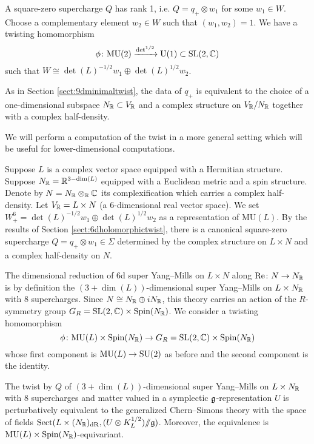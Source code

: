 \documentclass[10pt, oneside]{article}
\newcommand{\MU}{\mathrm{MU}}
\renewcommand{\Re}{\mathrm{Re}}
\newcommand{\Sect}{\mathrm{Sect}}
\renewcommand{\U}{\mathrm{U}}
\newcommand{\ham}{/\!\!/}
\begin{document}
A square-zero supercharge $Q$ has rank 1, i.e. $Q=q_+\otimes w_1$ for some $w_1\in W$. Choose a complementary element $w_2\in W$ such that $(w_1, w_2) = 1$. We have a twisting homomorphism
\[\phi\colon\MU(2)\xrightarrow{\det^{1/2}}\U(1)\subset \SL(2, \CC)\]
such that $W\cong \det(L)^{-1/2} w_1\oplus \det(L)^{1/2} w_2$.

As in Section \ref{sect:9dminimaltwist}, the data of $q_+$ is equivalent to the choice of a one-dimensional subspace $N_\mathbb R\subset V_\mathbb R$ and a complex structure on $V_\mathbb R/N_\mathbb R$ together with a complex half-density.

We will perform a computation of the twist in a more general setting which will be useful for lower-dimensional computations.

Suppose $L$ is a complex vector space equipped with a Hermitian structure. Suppose $N_\mathbb R=\mathbb R^{3-\dim(L)}$ equipped with a Euclidean metric and a spin structure. Denote by $N=N_\mathbb R\otimes_\mathbb R\mathbb C$ its complexification which carries a complex half-density. Let $V_\mathbb R=L\times N$ (a 6-dimensional real vector space). We set $W^6_+=\det(L)^{-1/2}w_1\oplus \det(L)^{1/2} w_2$ as a representation of $\MU(L)$. By the results of Section \ref{sect:6dholomorphictwist}, there is a canonical square-zero supercharge $Q=q_+\otimes w_1\in\Sigma$ determined by the complex structure on $L\times N$ and a complex half-density on $N$.

The dimensional reduction of 6d super Yang--Mills on $L\times N$ along $\Re\colon N\rightarrow N_\RR$ is by definition the $(3+\dim(L))$-dimensional super Yang--Mills on $L\times N_\mathbb R$ with 8 supercharges. Since $N\cong N_\mathbb R\oplus iN_\mathbb R$, this theory carries an action of the $R$-symmetry group $G_R=\mathrm{SL}(2, \mathbb C)\times \mathrm{Spin}(N_\mathbb R)$. We consider a twisting homomorphism
\[\phi\colon \MU(L)\times \Spin(N_\RR)\rightarrow G_R=\SL(2, \CC)\times \Spin(N_\RR)\]
whose first component is $\MU(L)\rightarrow \SU(2)$ as before and the second component is the identity.

\begin{theorem}
The twist by $Q$ of $(3+\dim(L))$-dimensional super Yang--Mills on $L\times N_\mathbb R$ with 8 supercharges and matter valued in a symplectic $\mathfrak g$-representation $U$ is perturbatively equivalent to the generalized Chern--Simons theory with the space of fields $\Sect(L\times (N_\RR)_{\mr{dR}}, (U\otimes K_L^{1/2})\ham \fg)$. Moreover, the equivalence is $\MU(L)\times \Spin(N_\RR)$-equivariant.
\label{thm:6dCSreduction}
\end{theorem}
\end{document}
